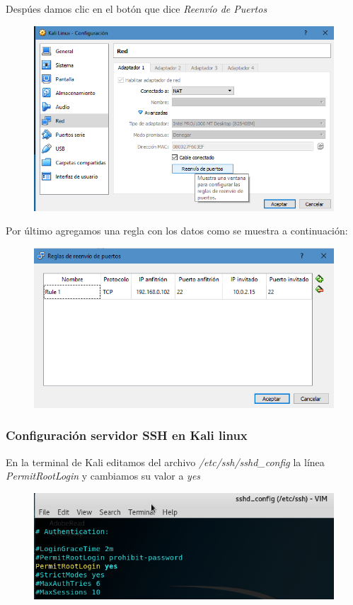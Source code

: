 \documentclass{article}
\begin{document}
Desp\'ues damos clic en el bot\'on que dice \emph{Reenv\'io de Puertos}

\begin{figure}[H]
\centering
\includegraphics[width=1\textwidth]{04-REENVIOPUERTOS}
\end{figure}

Por \'ultimo agregamos una regla con los datos como se muestra a continuaci\'on: 

\begin{figure}[H]
\centering
\includegraphics[width=1\textwidth]{05-CONFIGURADO}
\end{figure}

\subsubsection{Configuraci\'on servidor SSH en Kali linux}

En la terminal de Kali editamos del archivo \emph{/etc/ssh/sshd\_config} la l\'inea \emph{PermitRootLogin} y cambiamos su valor a \emph{yes}

\begin{figure}[H]
\centering
\includegraphics[width=1\textwidth]{06-CONFIGURACIONSSHD}
\end{figure}
\end{document}
